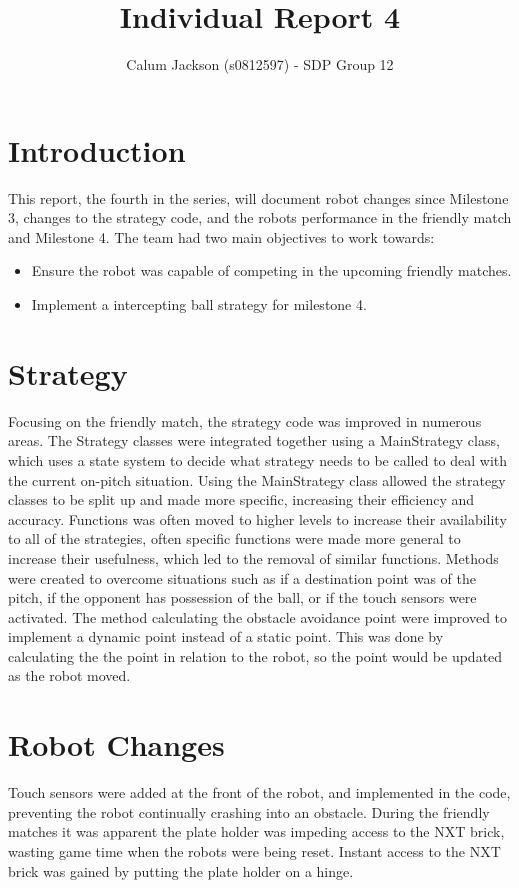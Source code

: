 \documentclass[12pt]{IEEEtran}
\begin{document}
	
\title{Individual Report 4}

\author{Calum Jackson (s0812597) - 
SDP Group 12}

\maketitle


\section{Introduction}
This report, the fourth in the series, will document robot changes since Milestone 3, changes to the strategy code, and the robots performance in the friendly match and Milestone 4. The team had two main objectives to work towards:
\begin{itemize}
\item Ensure the robot was capable of competing in the upcoming friendly matches.
\item Implement a intercepting ball strategy for milestone 4.
\end{itemize}

\section{Strategy}
Focusing on the friendly match, the strategy code was improved in numerous areas.  The Strategy classes were integrated together using a MainStrategy class, which uses a state system to decide what strategy needs to be called to deal with the current on-pitch situation. Using the MainStrategy class allowed the strategy classes to be split up and made more specific, increasing their efficiency and accuracy. Functions was often moved to higher levels to increase their availability to all of the strategies, often specific functions were made more general to increase their usefulness, which led to the removal of similar functions.
Methods were created to overcome situations such as if a destination point was of the pitch, if the opponent has possession of the ball, or if the touch sensors were activated.
The method calculating the obstacle avoidance point were improved to implement a dynamic point instead of a static point. This was done by calculating the the point in relation to the robot, so the point would be updated as the robot moved.

\section{Robot Changes}
Touch sensors were added at the front of the robot, and implemented in the code, preventing the robot continually crashing into an obstacle. During the friendly matches it was apparent the plate holder was impeding access to the NXT brick, wasting game time when the robots were being reset. Instant access to the NXT brick was gained by putting the plate holder on a hinge.
\end{document}
